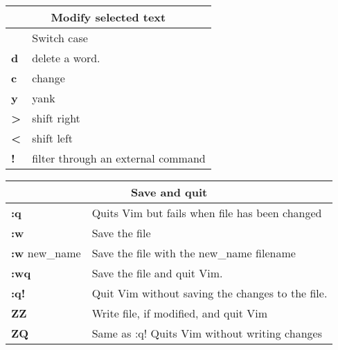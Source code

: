 \begin{table}[h]
\centering
\footnotesize
\begin{tabular}{|l|l|}
\multicolumn{2}{c}{\textbf{Modify selected text}}\\
\hline
\textbf{~}	& {Switch case}\\
\hline
\textbf{d}	& {delete a word.}\\
\hline
\textbf{c}	& {change}\\
\hline
\textbf{y}	& {yank}\\
\hline
\textbf{>}	& {shift right}\\
\hline
\textbf{<}	& {shift left}\\
\hline
\textbf{!}	& {filter through an external command}\\
\hline
\end{tabular}
\end{table}

\begin{table}[h]
\centering
\footnotesize
\begin{tabular}{|l|l|}
\multicolumn{2}{c}{\textbf{Save and quit}}\\
\hline
\textbf{:q}	& {Quits Vim but fails when file has been changed}\\
\hline
\textbf{:w}	& {Save the file}\\
\hline
{\textbf{:w} new\_name} & {Save the file with the new\_name filename}\\
\hline
\textbf{:wq} & {Save the file and quit Vim.}\\
\hline
\textbf{:q!} & {Quit Vim without saving the changes to the file.}\\
\hline
\textbf{ZZ}	& {Write file, if modified, and quit Vim}\\
\hline
\textbf{ZQ}	& {Same as :q! Quits Vim without writing changes}\\
\hline
\end{tabular}
\end{table}

